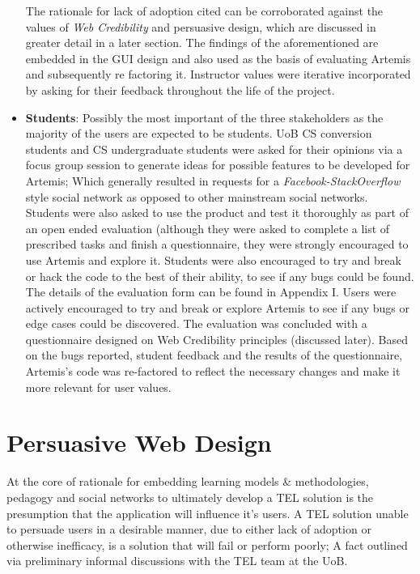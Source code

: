 \begin{itemize}
    The rationale for lack of adoption cited can be corroborated against the values of \textit{Web Credibility} and persuasive design, which are discussed in greater detail in a later section. The findings of the aforementioned are embedded in the GUI design and also used as the basis of evaluating Artemis and subsequently re factoring it. Instructor values were iterative incorporated by asking for their feedback throughout the life of the project.
    
    \item \textbf{Students}: Possibly the most important of the three stakeholders as the majority of the users are expected to be students. UoB CS conversion students and CS undergraduate students were asked for their opinions via a focus group session to generate ideas for possible features to be developed for Artemis; Which generally resulted in requests for a \textit{Facebook-StackOverflow} style social network as opposed to other mainstream social networks. Students were also asked to use the product and test it thoroughly as part of an open ended evaluation (although they were asked to complete a list of prescribed tasks and finish a questionnaire, they were strongly encouraged to use Artemis and explore it. Students were also encouraged to try and break or hack the code to the best of their ability, to see if any bugs could be found. The details of the evaluation form can be found in Appendix I. Users were actively encouraged to try and break or explore Artemis to see if any bugs or edge cases could be discovered. The evaluation was concluded with a questionnaire designed on Web Credibility principles (discussed later). Based on the bugs reported, student feedback and the results of the questionnaire, Artemis's code was re-factored to reflect the necessary changes and make it more relevant for user values.
\end{itemize}


\section{Persuasive Web Design}

At the core of rationale for embedding  learning models \& methodologies, pedagogy and social networks to ultimately develop a TEL solution is the presumption that the application will influence it's users. A TEL solution unable to persuade users in a desirable manner, due to either lack of adoption or otherwise inefficacy, is a solution that will fail or perform poorly; A fact outlined via preliminary informal discussions with the TEL team at the UoB.

